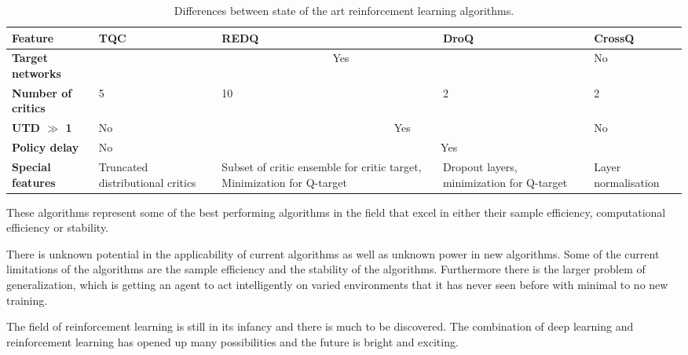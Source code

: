 \begin{table}[H]
    \footnotesize
    \centering
    \renewcommand{\arraystretch}{1.4} %
    \begin{tabularx}{\textwidth}{X X X X X}
        \hline
        \textbf{Feature} & \textbf{TQC} & \textbf{REDQ} & \textbf{DroQ} & \textbf{CrossQ} \\
        \hline
        \textbf{Target networks} & \multicolumn{3}{c}{Yes} & No \\
        \textbf{Number of critics} & 5 & 10 & 2 & 2 \\
        \textbf{UTD $\gg$ 1} & No & \multicolumn{2}{c}{Yes} & No \\
        \textbf{Policy delay} & No & \multicolumn{3}{c}{Yes} \\
        \textbf{Special features} & Truncated distributional critics  & Subset of critic ensemble for critic target, Minimization for Q-target & Dropout layers, minimization for Q-target & Layer normalisation \\
        \hline
    \end{tabularx}
    \caption{Differences between state of the art reinforcement learning algorithms.}
\end{table}

These algorithms represent some of the best performing algorithms in the field that excel in either their sample efficiency, computational efficiency or stability.

There is unknown potential in the applicability of current algorithms as well as unknown power in new algorithms. Some of the current limitations of the algorithms are the sample efficiency and the stability of the algorithms. Furthermore there is the larger problem of generalization, which is getting an agent to act intelligently on varied environments that it has never seen before with minimal to no new training.

The field of reinforcement learning is still in its infancy and there is much to be discovered. The combination of deep learning and reinforcement learning has opened up many possibilities and the future is bright and exciting.